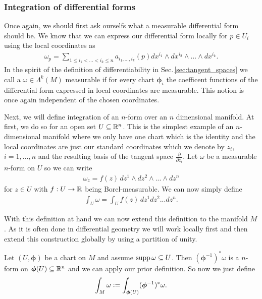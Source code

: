 \documentclass[../master_thesis.tex]{subfiles}
\begin{document}
\subsubsection{Integration of differential forms}\label{sec:integration_differential_forms_subsection}

Once again, we should first ask ourselfs what a measurable differential form 
should be. We know that we can express our differential form locally 
for $p \in U_i$ using the local coordinates as 
\begin{align*}
    \omega_p = \sum\limits_{1\leq i_1 < ... < i_k \leq n} 
        a_{i_1,...,i_k}(p) dx^{i_1} \wedge dx^{i_2} \wedge ... \wedge dx^{i_k}.
\end{align*}
In the spirit of the definition of differentiability 
in Sec.\,\ref{sec:tangent_spaces} we call a $\omega \in \Lambda^k (M)$
measurable if for every chart $\boldsymbol{\phi}_i$ the coefficent functions of the 
differential form expressed in local coordinates 
are measurable. This notion is once again independent of the chosen 
coordinates.

Next, we will define integration of an $n$-form over an $n$ dimensional 
manifold. At first, we do so for an open set $U \subseteq \mathbb{R}^n$.
This is the simplest example of an $n$-dimensional manifold where 
we only have one chart which is the identity and the local coordinates are 
just our standard coordinates which we denote by $z_i$, $i=1,...,n$ and the 
resulting basis of the tangent space $\frac{\partial}{\partial z_i}$. 
Let $\omega$ be a measurable 
$n$-form on $U$ so we can 
write 
\begin{align*}
    \omega_z = f(z)\, dz^1 \wedge dz^2 \wedge ... \wedge dz^n
\end{align*}
for $z \in U$ with $f:U \rightarrow \mathbb{R}$ being Borel-measurable. 
We can now simply define 
\begin{align*}
    \int_U \omega = \int_U f(z) \, dz^1 dz^2 ... dz^n.
\end{align*}

With this definition at hand we can now extend this definition to 
the manifold $M$. As it is often done in 
differential geometry we will work locally first and then extend this 
construction globally by using a partition of unity.

Let $(U,\boldsymbol{\phi})$ be a chart on $M$ and assume $\operatorname{supp} \omega \subseteq U$. 
Then $(\boldsymbol{\phi}^{-1})^* \omega$
is a $n$-form on $\boldsymbol{\phi}(U) \subseteq \mathbb{R}^n$ and 
we can apply our prior definition. So now we just define 
\begin{align*}
    \int_M \omega \vcentcolon= \int_{\boldsymbol{\phi}(U)} (\boldsymbol{\phi}^{-1})^* \omega.
\end{align*}
\end{document}
